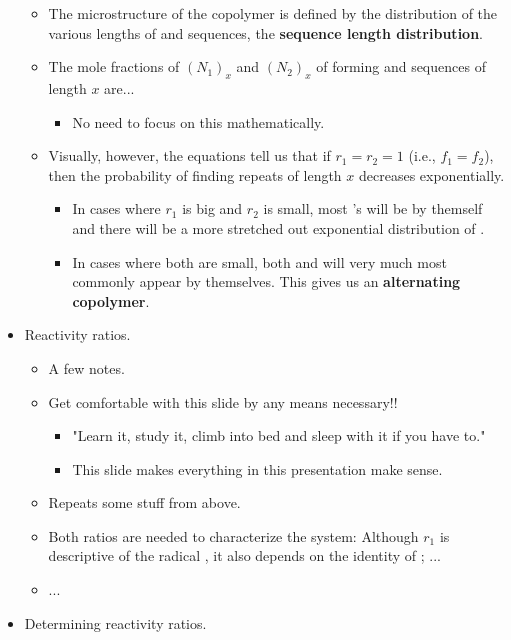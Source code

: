 \documentclass[../notes.tex]{subfiles}
\begin{document}
\begin{itemize}
\begin{itemize}
        \item The microstructure of the copolymer is defined by the distribution of the various lengths of  and  sequences, the \textbf{sequence length distribution}.
        \item The mole fractions of $(N_1)_x$ and $(N_2)_x$ of forming  and  sequences of length $x$ are...
        \begin{itemize}
            \item No need to focus on this mathematically.
        \end{itemize}
        \item Visually, however, the equations tell us that if $r_1=r_2=1$ (i.e., $f_1=f_2$), then the probability of finding repeats of length $x$ decreases exponentially.
        \begin{itemize}
            \item In cases where $r_1$ is big and $r_2$ is small, most 's will be by themself and there will be a more stretched out exponential distribution of .
            \item In cases where both are small, both  and  will very much most commonly appear by themselves. This gives us an \textbf{alternating copolymer}.
        \end{itemize}
    \end{itemize}
    \item Reactivity ratios.
    \begin{itemize}
        \item A few notes.
        \item Get comfortable with this slide by any means necessary!!
        \begin{itemize}
            \item "Learn it, study it, climb into bed and sleep with it if you have to."
            \item This slide makes everything in this presentation make sense.
        \end{itemize}
        \item Repeats some stuff from above.
        \item Both ratios are needed to characterize the system: Although $r_1$ is descriptive of the radical , it also depends on the identity of ; ...
        \item ...
    \end{itemize}
    \item Determining reactivity ratios.

\end{itemize}
\end{document}
